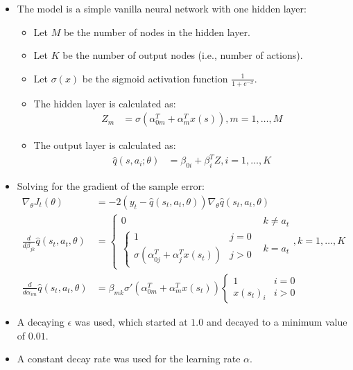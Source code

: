 \documentclass[a4paper]{article}
\begin{document}
\begin{itemize}
    \item The model is a simple vanilla neural network with one hidden layer:
    \begin{itemize}
        \item Let $M$ be the number of nodes in the hidden layer.
        \item Let $K$ be the number of output nodes (i.e., number of actions).
        \item Let $\sigma(x)$ be the sigmoid activation function
            $\frac{1}{1 + e^{-x}}$.
        \item The hidden layer is calculated as:
        \begin{align*}
            Z_{m} &= \sigma(\alpha^{T}_{0m} + \alpha^{T}_{m}x(s)), m = 1, \dots, M
        \end{align*}
        \item The output layer is calculated as:
        \begin{align*}
            \hat{q}(s, a_i; \theta) &= \beta_{0i} + \beta^{T}_{i}Z, i = 1, \dots, K
        \end{align*}
    \end{itemize}
    \item Solving for the gradient of the sample error:
    \begin{align*}
        \nabla_{\theta}J_t(\theta) &= -2(y_t - \hat{q}(s_t, a_t, \theta))
        \nabla_{\theta}\hat{q}(s_t, a_t, \theta)\\
        \frac{d}{d\beta_{jk}}\hat{q}(s_t, a_t, \theta) &=
        \begin{cases}
            0 & k \ne a_t\\
            \begin{cases}
                1 & j = 0\\
                \sigma(\alpha^{T}_{0j} + \alpha^{T}_{j}x(s_t)) & j > 0
            \end{cases} &  k = a_t
        \end{cases}, k = 1, \dots, K\\
        \frac{d}{d\alpha_{im}}\hat{q}(s_t, a_t, \theta) &=
        \beta_{mk}
        \sigma'(\alpha^{T}_{0m} + \alpha^{T}_{m}x(s_t))
        \begin{cases}
            1 & i = 0\\
            x(s_t)_{i} & i > 0
        \end{cases}
    \end{align*}
    \item A decaying $\epsilon$ was used, which started at $1.0$ and decayed to
        a minimum value of $0.01$.
    \item A constant decay rate was used for the learning rate $\alpha$.
\end{itemize}
\end{document}
